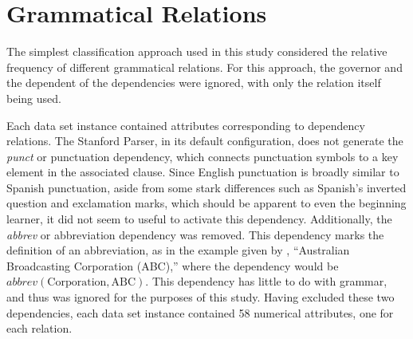 \documentclass[main.tex]{subfiles}
\begin{document}
\section{Grammatical Relations}
\setcounter{section}{5}

The simplest classification approach used in this study considered the relative frequency of different grammatical relations. For this approach, the governor and the dependent of the dependencies were ignored, with only the relation itself being used. 

Each data set instance contained attributes corresponding to dependency relations. The Stanford Parser, in its default configuration, does not generate the \textit{punct} or punctuation dependency, which connects punctuation symbols to a key element in the associated clause. Since English punctuation is broadly similar to Spanish punctuation, aside from some stark differences such as Spanish's inverted question and exclamation marks, which should be apparent to even the beginning learner, it did not seem to useful to activate this dependency. Additionally, the \textit{abbrev} or abbreviation dependency was removed. This dependency marks the definition of an abbreviation, as in the example given by \citet{typed-deps-manual}, ``Australian Broadcasting Corporation (ABC),'' where the dependency would be $abbrev(\text{Corporation},\text{ABC})$. This dependency has little to do with grammar, and thus was ignored for the purposes of this study. Having excluded these two dependencies, each data set instance contained 58 numerical attributes, one for each relation.
\end{document}
